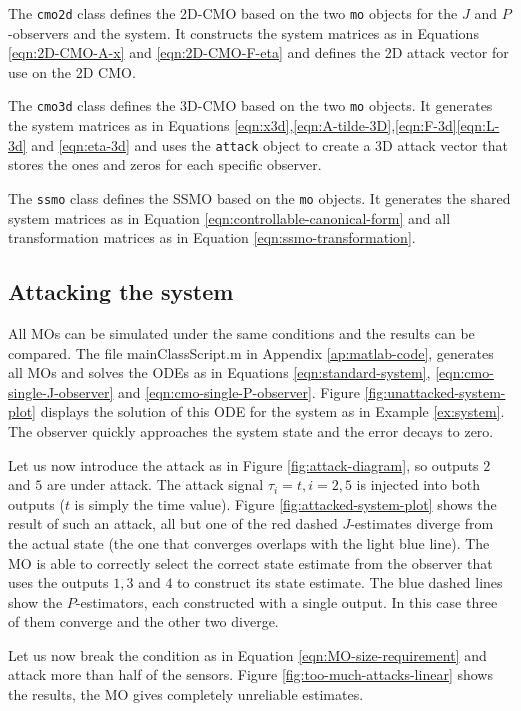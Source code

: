 The \texttt{cmo2d} class defines the 2D-CMO based on the two \texttt{mo} objects for the $J$ and $P$-observers and the system.  It constructs the system matrices as in Equations  \eqref{eqn:2D-CMO-A-x} and \eqref{eqn:2D-CMO-F-eta} and defines the 2D attack vector for use on the 2D CMO.

The \texttt{cmo3d} class defines the 3D-CMO based on the two \texttt{mo} objects. It generates the system matrices as in Equations \eqref{eqn:x3d},\eqref{eqn:A-tilde-3D},\eqref{eqn:F-3d}\eqref{eqn:L-3d} and \eqref{eqn:eta-3d} and uses the \texttt{attack} object to create a 3D attack vector that stores the ones and zeros for each specific observer.

The \texttt{ssmo} class defines the SSMO based on the \texttt{mo} objects. It generates the shared system matrices as in Equation \eqref{eqn:controllable-canonical-form} and all transformation matrices as in Equation \eqref{eqn:ssmo-transformation}. 

\subsection{Attacking the system}
All MOs can be simulated under the same conditions and the results can be compared. The file mainClassScript.m in Appendix \ref{ap:matlab-code}, generates all MOs and solves the ODEs as in Equations \eqref{eqn:standard-system}, \eqref{eqn:cmo-single-J-observer} and \eqref{eqn:cmo-single-P-observer}. Figure \ref{fig:unattacked-system-plot} displays the solution of this ODE for the system as in Example \ref{ex:system}. The observer quickly approaches the system state and the error decays to zero. 

Let us now introduce the attack as in Figure \ref{fig:attack-diagram}, so outputs $2$ and $5$ are under attack. The attack signal $\tau_i=t,i=2,5$ is injected into both outputs ($t$ is simply the time value). Figure \ref{fig:attacked-system-plot} shows the result of such an attack, all but one of the red dashed $J$-estimates diverge from the actual state (the one that converges overlaps with the light blue line). The MO is able to correctly select the correct state estimate from the observer that uses the outputs $1,3$ and $4$ to construct its state estimate. The blue dashed lines show the $P$-estimators, each constructed with a single output. In this case three of them converge and the other two diverge. 

Let us now break the condition as in Equation \eqref{eqn:MO-size-requirement} and attack more than half of the sensors. Figure \ref{fig:too-much-attacks-linear} shows the results, the MO gives completely unreliable estimates.

